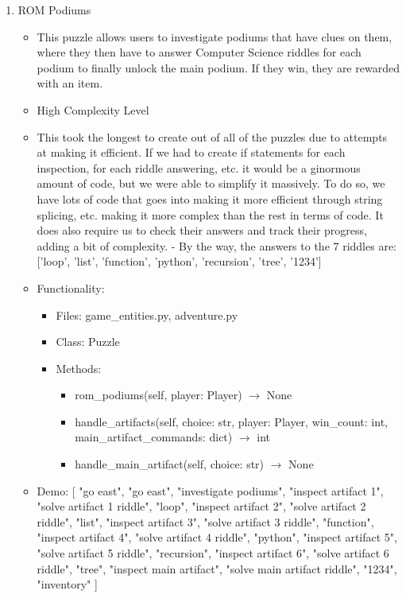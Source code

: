 \documentclass[11pt]{article}
\begin{document}
\begin{enumerate}
    \item ROM Podiums
    \begin{itemize}
        \item This puzzle allows users to investigate podiums that have clues on them, where they then have to answer Computer Science riddles for each podium to finally unlock the main podium. If they win, they are rewarded with an item.
        \item High Complexity Level
        \item This took the longest to create out of all of the puzzles due to attempts at making it efficient. If we had to create if statements for each inspection, for each riddle answering, etc. it would be a ginormous amount of code, but we were able to simplify it massively. To do so, we have lots of code that goes into making it more efficient through string splicing, etc. making it more complex than the rest in terms of code. It does also require us to check their answers and track their progress, adding a bit of complexity.
        - By the way, the answers to the 7 riddles are: ['loop', 'list', 'function', 'python', 'recursion', 'tree', '1234']
        \item Functionality:
        \begin{itemize}
            \item Files: game\_entities.py, adventure.py
            \item Class: Puzzle
            \item Methods:
                \begin{itemize}
                    \item rom\_podiums(self, player: Player) $\rightarrow$ None
                    \item handle\_artifacts(self, choice: str, player: Player, win\_count: int, main\_artifact\_commands: dict) $\rightarrow$ int
                    \item handle\_main\_artifact(self, choice: str) $\rightarrow$ None
                \end{itemize}
        \end{itemize}
        \item Demo: [
        "go east", "go east", "investigate podiums", "inspect artifact 1", "solve artifact 1 riddle",
        "loop", "inspect artifact 2", "solve artifact 2 riddle", "list",
        "inspect artifact 3", "solve artifact 3 riddle", "function", "inspect artifact 4",
        "solve artifact 4 riddle", "python",
        "inspect artifact 5", "solve artifact 5 riddle", "recursion", "inspect artifact 6",
        "solve artifact 6 riddle", "tree",
        "inspect main artifact", "solve main artifact riddle", "1234", "inventory"
    ]
    \end{itemize}


\end{enumerate}
\end{document}
